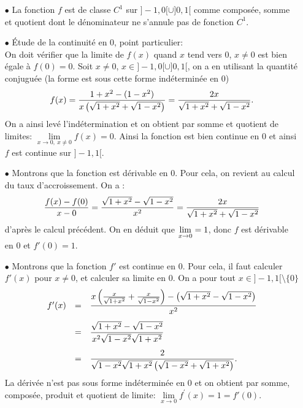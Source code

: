 \documentclass[a4paper, 11pt,reqno]{article}
\begin{document}
\begin{correction}  \;
	\begin{itemize}
		\item[$\bullet$] La fonction $f$ est de classe $C^1$ sur $\rbrack -1,0\lbrack\cup\rbrack 0,1\lbrack$ comme compos\'ee, somme et quotient
		      dont le d\'enominateur ne s'annule pas de fonction $C^1$.
		\item[$\bullet$] \'Etude de la continuit\'e en 0, point particulier:\\
		      On doit v\'erifier que la limite de $f(x)$ quand $x$ tend vers 0, $x\not= 0$ est bien \'egale \`a $f(0)=0$. Soit $x\not= 0$, $x\in \rbrack -1,0\lbrack\cup\rbrack 0,1\lbrack$, on a en utilisant la quantit\'e conjugu\'ee (la forme est sous cette forme ind\'etermin\'ee en 0)
		      $$f(x)=\displaystyle\frac{1+x^2-(1-x^2)}{x\left( \sqrt{1+x^2}+\sqrt{1-x^2}\right)}=\displaystyle\frac{2x}{\sqrt{1+x^2}+\sqrt{1-x^2}}.$$
		      On a ainsi lev\'e l'ind\'etermination et on obtient par somme et quotient de limites: $\lim\limits_{x\to 0,\ x\not= 0} f(x)=0.$
		      Ainsi la fonction est bien continue en 0 et ainsi $f$ est continue sur $\rbrack -1,1\lbrack$.
		\item[$\bullet$] Montrons que la fonction est d\'erivable en 0. Pour cela, on revient au calcul du taux d'accroissement. On a :
		      $$\frac{f(x)-f(0)}{x-0} = \frac{\sqrt{1+x^2}-\sqrt{1-x^2}}{x^2} = \displaystyle\frac{2x}{\sqrt{1+x^2}+\sqrt{1-x^2}}$$
		      d'apr\`es le calcul pr\'ec\'edent. On en d\'eduit que $\lim\limits_{x\to 0} =\displaystyle 1$, donc $f$ est d\'erivable en $0$ et $f'(0)=1$.
		\item[$\bullet$] Montrons que la fonction $f'$ est continue en 0. Pour cela, il faut calculer $f'(x)$ pour $x \not=0$, et calculer sa limite en $0$. On a pour tout $x\in\rbrack -1,1\lbrack\setminus\lbrace 0\rbrace$
		      $$\begin{array}{lll}
				      f^{\prime}(x) & = & \ddp\frac{  x\left( \frac{x}{\sqrt{1+x^2}}+\frac{x}{\sqrt{1-x^2}}   \right)-\left( \sqrt{1+x^2}-\sqrt{1-x^2}     \right)  }{x^2}\vsec \\
				                    & = & \ddp\frac{ \sqrt{1+x^2}-\sqrt{1-x^2}  }{ x^2\sqrt{1-x^2}\sqrt{1+x^2}  } \vsec                                                         \\
				                    & = & \ddp\frac{    2   }{   \sqrt{1-x^2}\sqrt{1+x^2}\left( \sqrt{1-x^2}+\sqrt{1+x^2} \right)  }.
			      \end{array}$$
		      La d\'eriv\'ee n'est pas sous forme ind\'etermin\'ee en 0 et on obtient par somme, compos\'ee, produit et quotient de limite: $\lim\limits_{x\to 0} f^{\prime}(x)=1 = f'(0).$

\end{itemize}
\end{correction}
\end{document}
